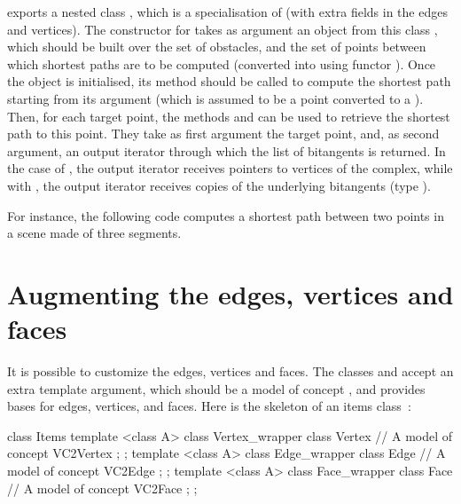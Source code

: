  exports a nested class
, which is a specialisation of
 (with extra fields in the edges
and vertices). The constructor for 
takes as argument an object from this class ,
which should be built over the set of obstacles, and the set of points
between which shortest paths are to be computed (converted into
 using functor
). Once the object is
initialised, its method  should
be called to compute the shortest path starting from its argument (which is
assumed to be a point converted to a ). Then, for
each target point, the methods  and
 can be used to retrieve the shortest path to this
point. They take as first argument the target point, and, as second
argument, an output iterator through which the list of bitangents is
returned. In the case of , the output iterator
receives pointers to vertices of the complex, while with
, the output iterator receives copies of the
underlying bitangents (type ).

For instance, the following code computes a shortest path between two
points in a scene made of three segments.


\section{Augmenting the edges, vertices and faces}

It is possible to customize the edges, vertices and faces. The classes
 and  accept an extra
template argument, which should be a model of concept , and
provides bases for edges, vertices, and faces. Here is the skeleton of an
items class~:

\begin{ccExampleCode}
class Items {
  template <class A> class Vertex_wrapper {
    class Vertex {
      // A model of concept VC2Vertex
    };
  };
  template <class A> class Edge_wrapper {
    class Edge {
      // A model of concept VC2Edge
    };
  };
  template <class A> class Face_wrapper {
    class Face {
      // A model of concept VC2Face
    };
  };
}
\end{ccExampleCode}

